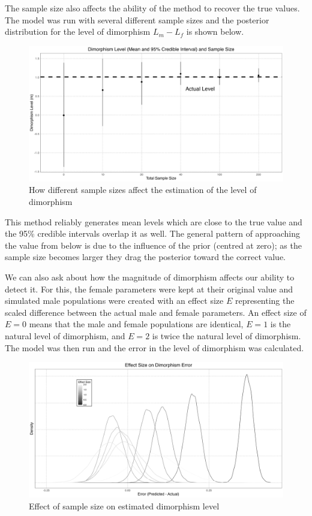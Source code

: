\documentclass[letterpaper]{article}
\begin{document}
The sample size also affects the ability of the method to recover the true values. The model was run with several different sample sizes and the posterior distribution for the level of dimorphism $L_m - L_f$ is shown below.

\begin{figure}[H]
	\centering
	\includegraphics[width = \textwidth]{images/alligatorSampleSize.png}
	\caption{How different sample sizes affect the estimation of the level of dimorphism}
	\label{fig:alligatorSampleSize}
\end{figure}

This method reliably generates mean levels which are close to the true value and the 95\% credible intervals overlap it as well. The general pattern of approaching the value from below is due to the influence of the prior (centred at zero); as the sample size becomes larger they drag the posterior toward the correct value.

We can also ask about how the magnitude of dimorphism affects our ability to detect it. For this, the female parameters were kept at their original value and simulated male populations were created with an effect size $E$ representing the scaled difference between the actual male and female parameters. An effect size of $E = 0$ means that the male and female populations are identical, $E = 1$ is the natural level of dimorphism, and $E = 2$ is twice the natural level of dimorphism. The model was then run and the error in the level of dimorphism was calculated.

\begin{figure}[H]
	\centering
	\includegraphics[width = \textwidth]{images/alligatorEffectSize.png}
	\caption{Effect of sample size on estimated dimorphism level}
	\label{fig:alligatorEffectSizes}
\end{figure}
\end{document}
